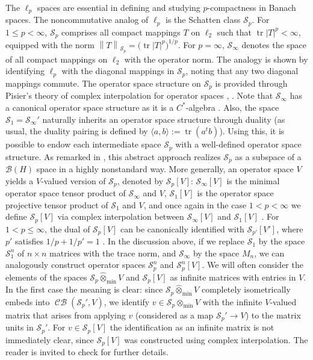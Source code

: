 \documentclass[11pt]{amsart}
\DeclareMathOperator{\CB}{\mathcal{CB}}
\DeclareMathOperator{\tr}{tr}
\newcommand{\n}[1]{ \left\|#1\right\| }
\numberwithin{equation}{section}
\begin{document}
The $\ell_p$ spaces are essential in defining and studying $p$-compactness in Banach spaces. The noncommutative analog of $\ell_p$ is the Schatten class $\mathcal{S}_p$. For $1 \le p < \infty$, $\mathcal{S}_p$ comprises all compact mappings $T$ on $\ell_2$ such that $\tr |T|^p < \infty$, equipped with the norm $\n{T}_{\mathcal{S}_p} = \big( \tr |T|^p \big)^{1/p}$. For $p=\infty$, $\mathcal{S}_\infty$ denotes the space of all compact mappings on $\ell_2$ with the operator norm.
The analogy  is shown by identifying $\ell_p$  with the diagonal mappings in $\mathcal{S}_p$,  noting that any two diagonal mappings commute.
The operator space structure on $\mathcal{S}_p$ is provided through Pisier's theory of complex interpolation for operator spaces \cite[Sec. 2]{Pisier-interpolation},  \cite[Sec. 2.7]{Pisier-OS-theory}. Note that
 $\mathcal{S}_\infty$ has a canonical operator space structure as it is a $C^*$-algebra  \cite[p. 21]{Effros-Ruan-book}. Also, the space $\mathcal{S}_1 = \mathcal{S}_\infty'$ naturally inherits an operator space structure through duality (as usual, the duality pairing is defined by $\langle a, b \rangle := \tr(a^t b)$). Using this, it is possible to endow each intermediate space $\mathcal{S}_p$ with a well-defined operator space structure.
As remarked in \cite[p. 141]{Pisier-OS-theory}, this abstract approach realizes $\mathcal{S}_p$ as a subspace of a $\mathcal B(H)$ space in a highly nonstandard way.
More generally, an operator space $V$ yields a $V$-valued version of $\mathcal{S}_p$, denoted by $\mathcal{S}_p[V]$:
$\mathcal{S}_\infty[V]$ is the minimal operator space tensor product of $\mathcal{S}_\infty$ and $V$,
$\mathcal{S}_1[V]$ is the operator space projective tensor product of $\mathcal{S}_1$ and $V$,
and once again in the case $1 < p < \infty$ we define $\mathcal{S}_p[V]$ via complex interpolation between $\mathcal{S}_\infty[V]$ and $\mathcal{S}_1[V]$  \cite{Pisier-Asterisque}.
For $1 < p \le \infty$, the dual of $\mathcal{S}_p[V]$ can be canonically identified with $\mathcal{S}_{p'}[V']$, where $p'$ satisfies $1/p +  1/p' = 1$ \cite[Cor. 1.8]{Pisier-Asterisque}.
In the discussion above, if we replace $\mathcal{S}_1$ by the space $\mathcal{S}_1^n$ of $n\times n$ matrices with the trace norm, and $\mathcal{S}_\infty$ by the space $M_n$, we can analogously construct operator spaces $\mathcal{S}_p^n$ and $\mathcal{S}_p^n[V]$.
We will often consider the elements of the spaces $\mathcal{S}_p \widehat\otimes_{\min} V$ and $\mathcal{S}_p[V]$ as infinite matrices with entries in $V$.
In the first case the meaning is clear: since $\mathcal{S}_p \widehat\otimes_{\min} V$ completely isometrically embeds into $\CB(\mathcal{S}_p',V)$, we identify $v \in \mathcal{S}_p \widehat\otimes_{\min} V$ with the infinite $V$-valued matrix that arises from applying $v$ (considered as a map $\mathcal{S}_p' \to V$) to the matrix units in $\mathcal{S}_p'$.
For $v \in \mathcal{S}_p[V]$ the identification as an infinite matrix is not immediately clear, since $\mathcal{S}_p[V]$ was constructed using complex interpolation.
The reader is invited to check \cite[pp. 18--20]{Pisier-Asterisque} for further details.
\end{document}
